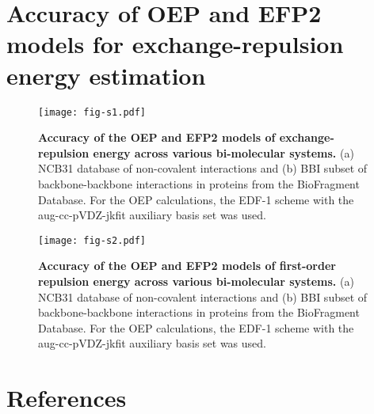 \documentclass[aip,jcp,amsmath,amssymb,reprint,floatfix]{revtex4-1}
\begin{document}
\section{Accuracy of OEP and EFP2 models for exchange-repulsion energy estimation}
%
\begin{figure*}[h]
\texttt{[image: fig-s1.pdf]}
\caption{\label{f:fig-2} {\bf Accuracy of the OEP and EFP2 models of exchange\hyp{}repulsion energy
across various bi\hyp{}molecular systems.} 
(a) NCB31 
database\cite{Zhao.Schultz.Truhlar.JCTC.2006,
Zhao.Truhlar.JCTC.2005,Zhao.Schultz.Truhlar.JCTC.2006,Zhao.Schultz.Truhlar.JCP.2005} 
of non\hyp{}covalent interactions
and
(b) BBI subset\cite{Burns.Faver.Zheng.Marshall.Smith.Vanommeslaeghe.MacKerell.Merz.Sherrill.JCP.2017} 
of backbone\hyp{}backbone interactions in proteins from the BioFragment Database.
For the OEP calculations, the EDF-1 scheme with the aug-cc-pVDZ-jkfit auxiliary basis set
was used.
} 
\end{figure*}
%
%
\begin{figure*}[b]
\texttt{[image: fig-s2.pdf]}
\caption{\label{f:fig-2} {\bf Accuracy of the OEP and EFP2 models of first\hyp{}order repulsion energy
across various bi\hyp{}molecular systems.} 
(a) NCB31 
database\cite{Zhao.Schultz.Truhlar.JCTC.2006,
Zhao.Truhlar.JCTC.2005,Zhao.Schultz.Truhlar.JCTC.2006,Zhao.Schultz.Truhlar.JCP.2005} 
of non\hyp{}covalent interactions
and
(b) BBI subset\cite{Burns.Faver.Zheng.Marshall.Smith.Vanommeslaeghe.MacKerell.Merz.Sherrill.JCP.2017} 
of backbone\hyp{}backbone interactions in proteins from the BioFragment Database.
For the OEP calculations, the EDF-1 scheme with the aug-cc-pVDZ-jkfit auxiliary basis set
was used.
} 
\end{figure*}
%


\clearpage
\section{References}


\end{document}
